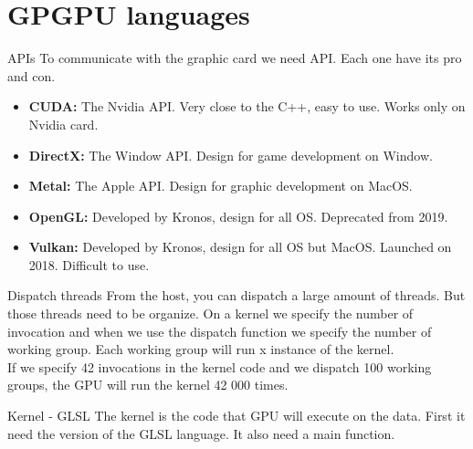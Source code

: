 \documentclass{beamer}
\begin{document}
\section{GPGPU languages}
\begin{frame}{APIs}
	To communicate with the graphic card we need API. Each one have its pro and con.
	\begin{itemize}
		\item \textbf{CUDA:} The Nvidia API. Very close to the C++, easy to use. Works only on Nvidia card.
		\item \textbf{DirectX:} The Window API. Design for game development on Window.
		\item \textbf{Metal:} The Apple API. Design for graphic development on MacOS.
		\item \textbf{OpenGL:} Developed by Kronos, design for all OS. Deprecated from 2019.
		\item \textbf{Vulkan:} Developed by Kronos, design for all OS but MacOS. Launched on 2018. Difficult to use.
	\end{itemize}
\end{frame}

\begin{frame}{Dispatch threads}
	From the host, you can dispatch a large amount of threads. But those threads need to be organize. On a kernel we specify the number of invocation and when we use the dispatch function we specify the number of working group. Each working group will run x instance of the kernel.\\
	If we specify 42 invocations in the kernel code and we dispatch 100 working groups, the GPU will run the kernel 42 000 times.
\end{frame}



\begin{frame}{Kernel - GLSL}
	The kernel is the code that GPU will execute on the data. First it need the version of the GLSL language. It also need a main function.
	\codeKernelMain
\end{frame}

\end{document}
